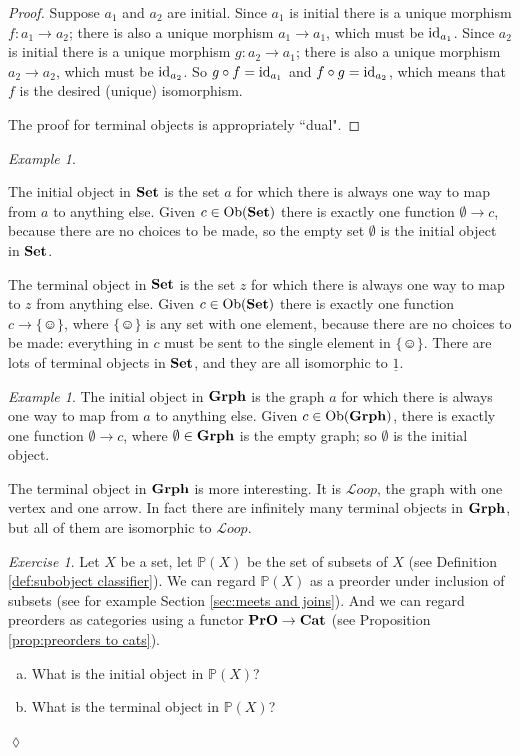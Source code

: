 \documentclass{book}
\def\tn{\textnormal}
\def\mc{\mathcal}
\def\PP{{\mathbb P}}
\def\Ob{\tn{Ob}}
\def\singleton{\{\smiley\}}
\def\to{\rightarrow}
\def\taking{\colon}
\def\ul{\underline}
\def\id{\tn{id}}
\def\Cat{{\bf Cat}}
\def\Grph{{\bf Grph}}
\def\Set{{\bf Set}}
\def\PrO{{\bf PrO}}
\def\mcL{\mc{L}}
\def\Loop{{\mcL oop}}
\theoremstyle{remark}
\newtheorem{example}[subsubsection]{Example}
\newtheorem{exc}[subsubsection]{Exercise}
\newenvironment{exercise}{\begin{exc}}{\hspace*{\fill}$\lozenge$\end{exc}}
\theoremstyle{definition}
\def\sexc{\begin{enumerate}[a.)]\setlength{\itemsep}{.1cm}\setlength{\parskip}{.1cm}\item}
\def\next{\item}
\def\endsexc{\end{enumerate}}
\begin{document}
\begin{proof}

Suppose $a_1$ and $a_2$ are initial. Since $a_1$ is initial there is a unique morphism $f\taking a_1\to a_2$; there is also a unique morphism $a_1\to a_1$, which must be $\id_{a_1}$. Since $a_2$ is initial there is a unique morphism $g\taking a_2\to a_1$; there is also a unique morphism $a_2\to a_2$, which must be $\id_{a_2}$. So $g\circ f=\id_{a_1}$ and $f\circ g=\id_{a_2}$, which means that $f$ is the desired (unique) isomorphism.

The proof for terminal objects is appropriately ``dual".

\end{proof}

\begin{example}\label{ex:universal obs in set}

The initial object in $\Set$ is the set $a$ for which there is always one way to map from $a$ to anything else. Given $c\in\Ob(\Set)$ there is exactly one function $\emptyset\to c$, because there are no choices to be made, so the empty set $\emptyset$ is the initial object in $\Set$.

The terminal object in $\Set$ is the set $z$ for which there is always one way to map to $z$ from anything else. Given $c\in\Ob(\Set)$ there is exactly one function $c\to\singleton$, where $\singleton$ is any set with one element, because there are no choices to be made: everything in $c$ must be sent to the single element in $\singleton$. There are lots of terminal objects in $\Set$, and they are all isomorphic to $\ul{1}$.

\end{example}

\begin{example}

The initial object in $\Grph$ is the graph $a$ for which there is always one way to map from $a$ to anything else. Given $c\in\Ob(\Grph)$, there is exactly one function $\emptyset\to c$, where $\emptyset\in\Grph$ is the empty graph; so $\emptyset$ is the initial object.

The terminal object in $\Grph$ is more interesting. It is $\Loop$, the graph with one vertex and one arrow. In fact there are infinitely many terminal objects in $\Grph$, but all of them are isomorphic to $\Loop$. 

\end{example}

\begin{exercise}
Let $X$ be a set, let $\PP(X)$ be the set of subsets of $X$ (see Definition \ref{def:subobject classifier}). We can regard $\PP(X)$ as a preorder under inclusion of subsets (see for example Section \ref{sec:meets and joins}). And we can regard preorders as categories using a functor $\PrO\to\Cat$ (see Proposition \ref{prop:preorders to cats}).
\sexc What is the initial object in $\PP(X)$?
\next What is the terminal object in $\PP(X)$? 
\endsexc
\end{exercise}
\end{document}
